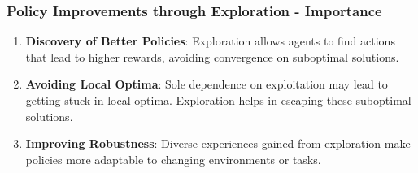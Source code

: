 \documentclass{beamer}
\begin{document}
\begin{frame}[fragile]
    \frametitle{Policy Improvements through Exploration - Importance}
    \begin{enumerate}
        \item \textbf{Discovery of Better Policies}: Exploration allows agents to find actions that lead to higher rewards, avoiding convergence on suboptimal solutions.
        \item \textbf{Avoiding Local Optima}: Sole dependence on exploitation may lead to getting stuck in local optima. Exploration helps in escaping these suboptimal solutions.
        \item \textbf{Improving Robustness}: Diverse experiences gained from exploration make policies more adaptable to changing environments or tasks.
    \end{enumerate}
\end{frame}
\end{document}
